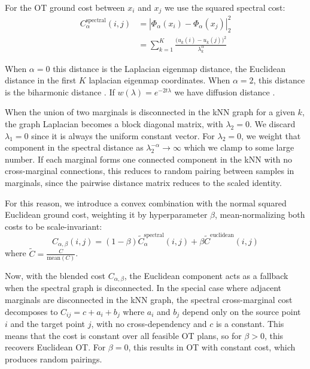 For the OT ground cost between $x_i$ and $x_j$ we use the squared spectral cost:
\begin{equation}
    \begin{aligned}
        C_\alpha^{\text{spectral}}(i,j)
        &=\left | \Phi_\alpha(x_i)-\Phi_\alpha(x_j) \right|_2^2\\
        &=\sum_{k=1}^K\frac{\bigl(u_k(i)-u_k(j) \bigr)^2}{\lambda_k^\alpha}
\end{aligned}
\label{eq:spectral_cost}
\end{equation}

When $\alpha=0$ this distance is the Laplacian eigenmap distance, the Euclidean distance in the first $K$ laplacian eigenmap coordinates. When $\alpha=2$, this distance is the biharmonic distance \cite{lipmanBiharmonicDistance2010}. If $w(\lambda)=e^{-2t\lambda}$ we have diffusion distance \cite{coifmanDiffusionMaps2006}.

When the union of two marginals is disconnected in the kNN graph for a given $k$, the graph Laplacian becomes a block diagonal matrix, with $\lambda_2=0$. We discard $\lambda_1=0$ since it is always the uniform constant vector. For $\lambda_2=0$, we weight that component in the spectral distance as $\lambda_2^{-\alpha} \to \infty$ which we clamp to some large number. If each marginal forms one connected component in the kNN with no cross-marginal connections, this reduces to random pairing between samples in marginals, since the pairwise distance matrix reduces to the scaled identity.

For this reason, we introduce a convex combination with the normal squared Euclidean ground cost, weighting it by hyperparameter $\beta$, mean-normalizing both costs to be scale-invariant:
\begin{equation}
C_{\alpha,\beta}(i,j)=(1-\beta)\tilde C_\alpha^{\text{spectral}}(i,j)+\beta\tilde C^{\text{euclidean}}(i,j)
\label{eq:blended_cost}
\end{equation}
where $\tilde C=\frac{C}{\text{mean}(C)}$.

Now, with the blended cost $C_{\alpha,\beta}$, the Euclidean component acts as a fallback when the spectral graph is disconnected. In the special case where adjacent marginals are disconnected in the kNN graph, the spectral cross-marginal cost decomposes to $C_{ij}=c+a_i+b_j$ where $a_i$ and $b_j$ depend only on the source point $i$ and the target point $j$, with no cross-dependency and $c$ is a constant. This means that the cost is constant over all feasible OT plans, so for $\beta> 0$, this recovers Euclidean OT. For $\beta=0$, this results in OT with constant cost, which produces random pairings.

